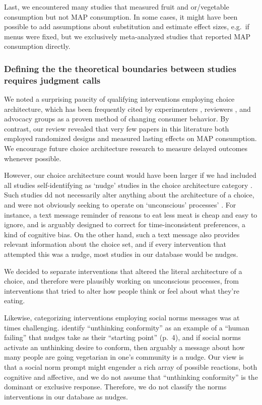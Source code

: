 \documentclass[sn-nature,referee,pdflatex]{sn-jnl}
\begin{document}
Last, we encountered many studies that measured fruit and or/vegetable
consumption but not MAP consumption. In some cases, it might have been
possible to add assumptions about substitution and estimate effect
sizes, e.g.~if menus were fixed, but we exclusively meta-analyzed
studies that reported MAP consumption directly.

\subsubsection{Defining the the theoretical boundaries between studies
requires judgment calls}\label{sec5.4.4}

We noted a surprising paucity of qualifying interventions employing
choice architecture, which has been frequently cited by experimenters
\citep{boronowsky2022}, reviewers \citep{meier2022}, and advocacy groups
\citep{zhang2022} as a proven method of changing consumer behavior. By
contrast, our review revealed that very few papers in this literature
both employed randomized designs and measured lasting effects on MAP
consumption. We encourage future choice architecture research to measure
delayed outcomes whenever possible.

However, our choice architecture count would have been larger if we had
included all studies self-identifying as `nudge' studies in the choice
architecture category \citep{thaler2009}. Such studies dd not
necessarily alter anything about the architecture of a choice, and were
not obviously seeking to operate on `unconscious' processes'
\citep{garnett2020}. For instance, a text message reminder of reasons to
eat less meat is cheap and easy to ignore, and is arguably designed to
correct for time-inconsistent preferences, a kind of cognitive bias. On
the other hand, such a text message also provides relevant information
about the choice set, and if every intervention that attempted this was
a nudge, most studies in our database would be nudges.

We decided to separate interventions that altered the literal
architecture of a choice, and therefore were plausibly working on
unconscious processes, from interventions that tried to alter how people
think or feel about what they're eating.

Likewise, categorizing interventions employing social norms messages was
at times challenging. \citep{mols2015} identify ``unthinking
conformity'' as an example of a ``human failing'' that nudges take as
their ``starting point'' (p.~4), and if social norms activate an
unthinking desire to conform, then arguably a message about how many
people are going vegetarian in one's community is a nudge. Our view is
that a social norm prompt might engender a rich array of possible
reactions, both cognitive and affective, and we do not assume that
``unthinking conformity'' is the dominant or exclusive response.
Therefore, we do not classify the norms interventions in our database as
nudges.
\end{document}
